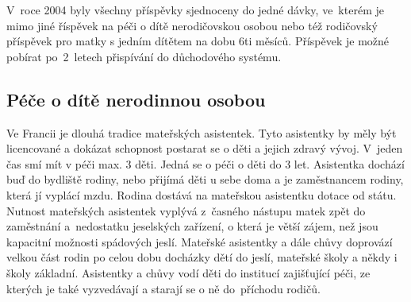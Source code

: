 				V roce 2004 byly všechny příspěvky sjednoceny do jedné dávky, ve kterém je mimo jiné říspěvek na péči o dítě nerodičovskou osobou nebo též rodičovský příspěvek pro matky s jedním dítětem na dobu 6ti měsíců. Příspěvek je možné pobírat po 2 letech přispívání do důchodového systému. \citep{Dennipece}

			\subsection{Péče o dítě nerodinnou osobou}
				Ve Francii je dlouhá tradice mateřských asistentek. Tyto asistentky by měly být licencované a dokázat schopnost postarat se o děti a jejich zdravý vývoj. V jeden čas smí mít v péči max. 3 děti. Jedná se o péči o děti do 3 let. Asistentka dochází buď do bydliště rodiny, nebo přijímá děti u sebe doma a je zaměstnancem rodiny, která jí vyplácí mzdu. Rodina dostává na mateřskou asistentku dotace od státu.
				Nutnost mateřských asistentek vyplývá z časného nástupu matek zpět do zaměstnání a nedostatku jeselských zařízení, o která je větší zájem, než jsou kapacitní možnosti spádových jeslí. Mateřské asistentky a dále chůvy doprovází velkou část rodin po celou dobu docházky dětí do jeslí, mateřské školy a někdy i školy základní. Asistentky a chůvy vodí děti do institucí zajišťující péči, ze kterých je také vyzvedávají a starají se o ně do příchodu rodičů.
